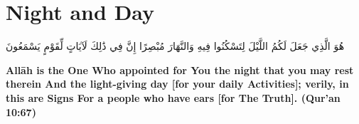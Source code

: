 \chapter{Night and Day}
\begin{center}
    {\Huge    
        \begin{Arabic}
            هُوَ الَّذِي جَعَلَ لَكُمُ اللَّيْلَ لِتَسْكُنُوا فِيهِ وَالنَّهَارَ مُبْصِرًا إِنَّ فِي ذَٰلِكَ لَآيَاتٍ لِّقَوْمٍ يَسْمَعُونَ
        \end{Arabic}
    }    
\end{center}
\vspace*{\fill}
\vspace{3cm}
\begin{center}
    \large \textbf{Allāh is the One Who appointed for You the night that you may rest therein And the light-giving day [for your daily Activities]; verily, in this are Signs For a people who have ears [for The Truth]. (Qur'an 10:67)}
\end{center}
